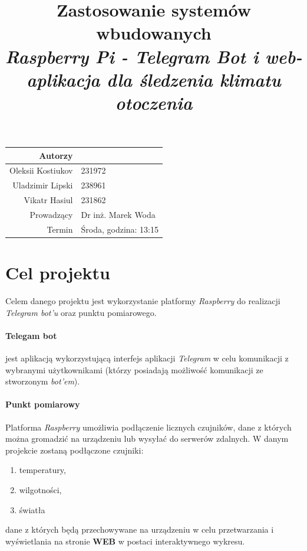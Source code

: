 \documentclass[a4paper]{article}
\title{
	\textbf{Zastosowanie systemów wbudowanych}\\
	\textit{Raspberry Pi - Telegram Bot i web-aplikacja dla śledzenia klimatu otoczenia}
	}
\date{}
\begin{document}
\begin{table}
	\vspace{-2cm}
	\begin{tabular}{rl}
		Autorzy & \\
			\hline
		Oleksii Kostiukov  	& 231972\\
		Uladzimir Lipski	& 238961\\
		Vikatr Hasiul 		& 231862\\[0.4cm]
			\hline
		Prowadzący 	& Dr inż. Marek Woda \\
		Termin		& Środa, godzina: 13:15\\
	\end{tabular}
\end{table}

{\let\newpage\relax\maketitle}
\maketitle
\thispagestyle{empty} %

\maketitle
\newpage
\tableofcontents
\newpage
\section{Cel projektu}
	Celem danego projektu jest wykorzystanie platformy \textit{Raspberry} 
	do realizacji \textit{Telegram bot'u} oraz punktu pomiarowego.

	\paragraph{Telegam bot} jest aplikacją wykorzystującą interfejs aplikacji \textit{Telegram}
	w celu komunikacji z wybranymi użytkownikami (którzy posiadają możliwość komunikacji ze stworzonym
	\textit{bot'em}).

	\paragraph{Punkt pomiarowy} Platforma \textit{Raspberry} umożliwia podłączenie licznych
	czujników, dane z których można gromadzić na urządzeniu lub wysyłać do serwerów zdalnych.
	W danym projekcie zostaną podłączone czujniki:
	\begin{enumerate}
		\item temperatury,
		\item wilgotności,
		\item światła
	\end{enumerate}
	dane z których będą przechowywane na urządzeniu w celu przetwarzania i 
	wyświetlania na stronie \textbf{WEB} w postaci interaktywnego wykresu.
	
\end{document}
